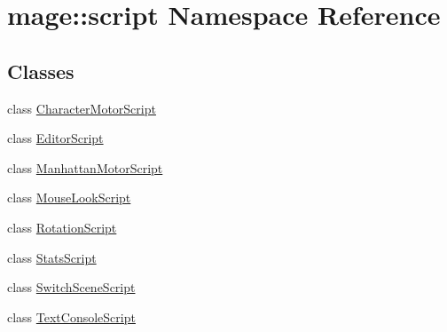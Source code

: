 \hypertarget{namespacemage_1_1script}{}\section{mage\+:\+:script Namespace Reference}
\label{namespacemage_1_1script}
\subsection*{Classes}
\begin{DoxyCompactItemize}
\item 
class \mbox{\hyperlink{classmage_1_1script_1_1_character_motor_script}{Character\+Motor\+Script}}
\item 
class \mbox{\hyperlink{classmage_1_1script_1_1_editor_script}{Editor\+Script}}
\item 
class \mbox{\hyperlink{classmage_1_1script_1_1_manhattan_motor_script}{Manhattan\+Motor\+Script}}
\item 
class \mbox{\hyperlink{classmage_1_1script_1_1_mouse_look_script}{Mouse\+Look\+Script}}
\item 
class \mbox{\hyperlink{classmage_1_1script_1_1_rotation_script}{Rotation\+Script}}
\item 
class \mbox{\hyperlink{classmage_1_1script_1_1_stats_script}{Stats\+Script}}
\item 
class \mbox{\hyperlink{classmage_1_1script_1_1_switch_scene_script}{Switch\+Scene\+Script}}
\item 
class \mbox{\hyperlink{classmage_1_1script_1_1_text_console_script}{Text\+Console\+Script}}
\end{DoxyCompactItemize}

